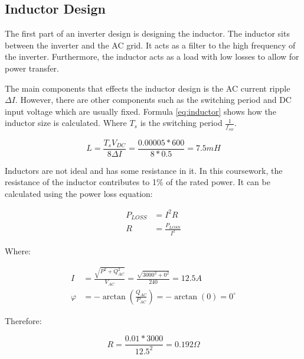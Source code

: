 \documentclass[12pt]{article}
\begin{document}
\subsection{Inductor Design}

The first part of an inverter design is designing the inductor.
The inductor sits between the inverter and the AC grid.
It acts as a filter to the high frequency of the inverter.
Furthermore, the inductor acts as a load with low losses to allow for power transfer.

The main components that effects the inductor design is the AC current ripple $\Delta{I}$.
However, there are other components such as the switching period and DC input voltage which are usually fixed.
Formula \ref{eq:inductor} shows how the inductor size is calculated.
Where $T_{s}$ is the switching period $\frac{1}{f_{sw}}$.

\begin{equation} \label{eq:inductor}
    L = \frac{T_{s} V_{DC}}{8 \Delta{I}} = \frac{0.00005 * 600}{8 * 0.5} = 7.5 mH
\end{equation}

Inductors are not ideal and has some resistance in it.
In this coursework, the resistance of the inductor contributes to 1\% of the rated power.
It can be calculated using the power loss equation:

\begin{equation}
    \begin{aligned}
        P_{LOSS} & = I^{2} R                \\
        R        & = \frac{P_{LOSS}}{I^{2}}
    \end{aligned}
\end{equation}

Where:

\begin{equation}
    \begin{aligned}
        I       & = \frac{\sqrt{P^{2} + Q_{AC}^{2}}}{V_{AC}} = \frac{\sqrt{3000^{2} + 0^{2}}}{240} = 12.5 A \\
        \varphi & = -\arctan(\frac{Q_{AC}}{P_{AC}}) = -\arctan(0) = 0^{\circ{}}
    \end{aligned}
\end{equation}

Therefore:

\begin{equation}
    R = \frac{0.01 * 3000}{12.5^{2}} = 0.192 \Omega
\end{equation}
\end{document}
